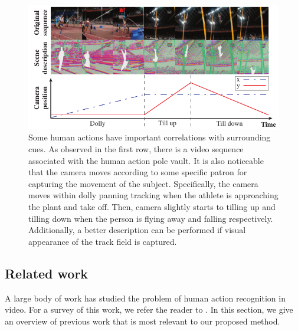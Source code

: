 \begin{figure}[ht]
\begin{center}
\includegraphics[width=0.98\linewidth]{fig/PullFigure.pdf}
\end{center}
\caption{Some human actions have important correlations with surrounding cues. As observed in the first row, there is a video sequence associated with the human action pole vault. It is also noticeable that the camera moves according to some specific patron for capturing the movement of the subject. Specifically, the camera moves within dolly panning tracking when the athlete is approaching the plant and take off. Then, camera slightly starts to tilling up and tilling down when the person is flying away and falling respectively. Additionally, a better description can be performed if visual appearance of the track field is captured.}
\label{fig:pull_figure}
\end{figure}


\subsection*{Related work}\label{subsec: related work}
A large body of work has studied the problem of human action recognition in video. For a survey of this work, we refer the reader to \cite{aggarwal2011}. In this section, we give an overview of previous work that is most relevant to our proposed method.


